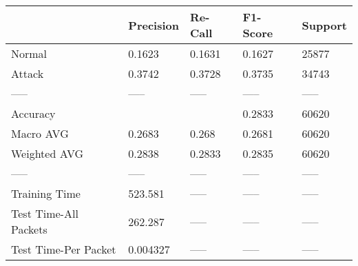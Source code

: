\begin{tabular}{lllll}
\toprule
{} & Precision & Re-Call & F1-Score & Support \\
\midrule
Normal                &    0.1623 &  0.1631 &   0.1627 &   25877 \\
Attack                &    0.3742 &  0.3728 &   0.3735 &   34743 \\
-----                 &     ----- &   ----- &    ----- &   ----- \\
Accuracy              &           &         &   0.2833 &   60620 \\
Macro AVG             &    0.2683 &   0.268 &   0.2681 &   60620 \\
Weighted AVG          &    0.2838 &  0.2833 &   0.2835 &   60620 \\
-----                 &     ----- &   ----- &    ----- &   ----- \\
Training Time         &   523.581 &   ----- &    ----- &   ----- \\
Test Time-All Packets &   262.287 &   ----- &    ----- &   ----- \\
Test Time-Per Packet  &  0.004327 &   ----- &    ----- &   ----- \\
\bottomrule
\end{tabular}
